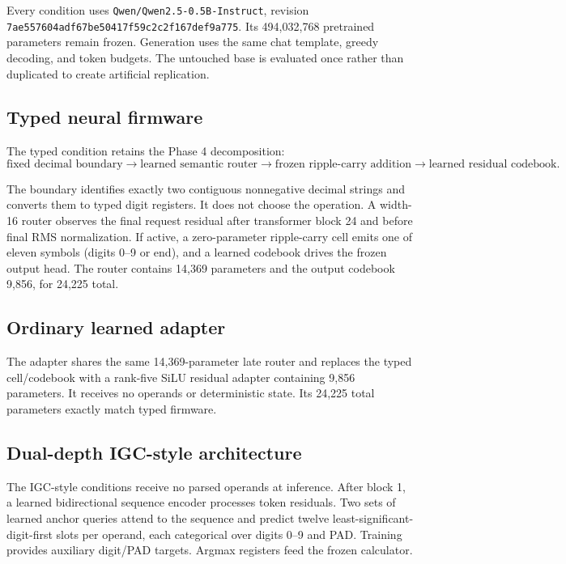\documentclass[11pt]{article}
\newcommand{\code}[1]{\texttt{#1}}
\begin{document}
Every condition uses
\code{Qwen/Qwen2.5-0.5B-Instruct}, revision
\code{7ae557604adf67be50417f59c2c2f167def9a775}. Its 494,032,768 pretrained
parameters remain frozen. Generation uses the same chat template, greedy
decoding, and token budgets. The untouched base is evaluated once rather than
duplicated to create artificial replication.

\subsection{Typed neural firmware}

The typed condition retains the Phase 4 decomposition:
\[
\text{fixed decimal boundary}
\rightarrow
\text{learned semantic router}
\rightarrow
\text{frozen ripple-carry addition}
\rightarrow
\text{learned residual codebook}.
\]

The boundary identifies exactly two contiguous nonnegative decimal strings
and converts them to typed digit registers. It does not choose the operation.
A width-16 router observes the final request residual after transformer block
24 and before final RMS normalization. If active, a zero-parameter
ripple-carry cell emits one of eleven symbols (digits 0--9 or end), and a
learned codebook drives the frozen output head. The router contains 14,369
parameters and the output codebook 9,856, for 24,225 total.

\subsection{Ordinary learned adapter}

The adapter shares the same 14,369-parameter late router and replaces the
typed cell/codebook with a rank-five SiLU residual adapter containing 9,856
parameters. It receives no operands or deterministic state. Its 24,225 total
parameters exactly match typed firmware.

\subsection{Dual-depth IGC-style architecture}

The IGC-style conditions receive no parsed operands at inference. After block
1, a learned bidirectional sequence encoder processes token residuals. Two
sets of learned anchor queries attend to the sequence and predict twelve
least-significant-digit-first slots per operand, each categorical over digits
0--9 and PAD. Training provides auxiliary digit/PAD targets. Argmax registers
feed the frozen calculator.
\end{document}
